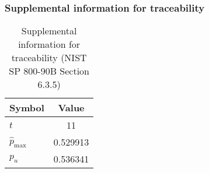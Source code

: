 \documentclass[a3paper,xelatex,english]{bxjsarticle}
\begin{document}
\subsubsection{Supplemental information for traceability}
\renewcommand{\arraystretch}{1.8}
\begin{table}[h]
\caption{Supplemental information for traceability (NIST SP 800-90B Section 6.3.5)}
\begin{center}
\begin{tabular}{|l|c|}
\hline 
\rowcolor{anotherlightblue} %
Symbol				& Value \\ \hline 
$t$				&       11\\ \hline 
$\hat{p}_{\textrm{max}}$ 			& 0.529913\\ \hline
$p_u$				& 0.536341\\ \hline
\end{tabular}
\end{center}
\end{table}
\renewcommand{\arraystretch}{1.4}
\clearpage
\end{document}
